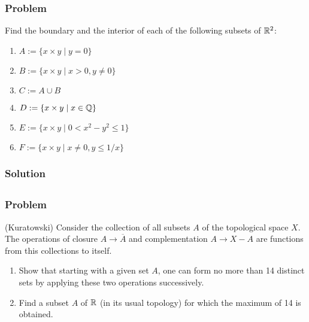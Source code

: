\subsubsection{Problem}
Find the boundary and the interior of each of the following subsets of $\mathbb R^2$:
\begin{enumerate}
    \item $A := \{ x \times y \mid y = 0 \}$
    \item $B := \{ x \times y \mid x > 0, y \neq 0 \}$
    \item $C := A \cup B$
    \item $D := \{ x \times y \mid x \in \mathbb Q \}$
    \item $E := \{ x \times y \mid 0 < x^2-y^2 \leq 1 \}$
    \item $F := \{ x \times y \mid x \neq 0, y \leq 1/x \}$
\end{enumerate}

\subsubsection{Solution}
\todo


\subsection{}

\subsubsection{Problem}
(Kuratowski) Consider the collection of all subsets $A$ of the topological space $X$. The operations of closure $A \to \overline{A}$ and complementation $A \to X-A$ are functions from this collections to itself.
\begin{enumerate}
    \item Show that starting with a given set $A$, one can form no more than 14 distinct sets by applying these two operations successively.
    \item Find a subset $A$ of $\mathbb R$ (in its usual topology) for which the maximum of 14 is obtained.
\end{enumerate}

